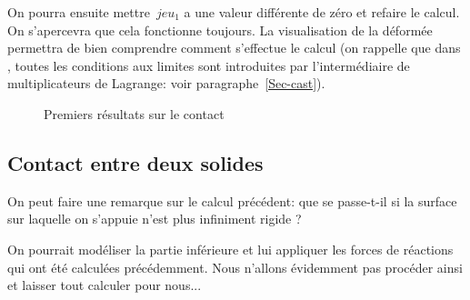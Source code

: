 On pourra ensuite mettre~$jeu_1$ a une valeur différente de zéro et refaire le calcul. On s'apercevra que cela fonctionne toujours. La visualisation de la déformée permettra de bien comprendre comment s'effectue le calcul (on rappelle que dans \castem, toutes les conditions aux limites sont introduites par l'intermédiaire de multiplicateurs de Lagrange: voir paragraphe~\ref{Sec-cast}).
\begin{figure}[ht]
   \hfill
  \caption{\label{Fig-Cont1} Premiers résultats sur le contact}
\end{figure}






\medskip
\subsection{Contact entre deux solides}

On peut faire une remarque sur le calcul précédent: que se passe-t-il si la surface sur laquelle on s'appuie n'est plus infiniment rigide ?

\medskip
On pourrait modéliser la partie inférieure et lui appliquer les forces de réactions qui ont été calculées précédemment.
Nous n'allons évidemment pas procéder ainsi et laisser \castem tout calculer pour nous...

